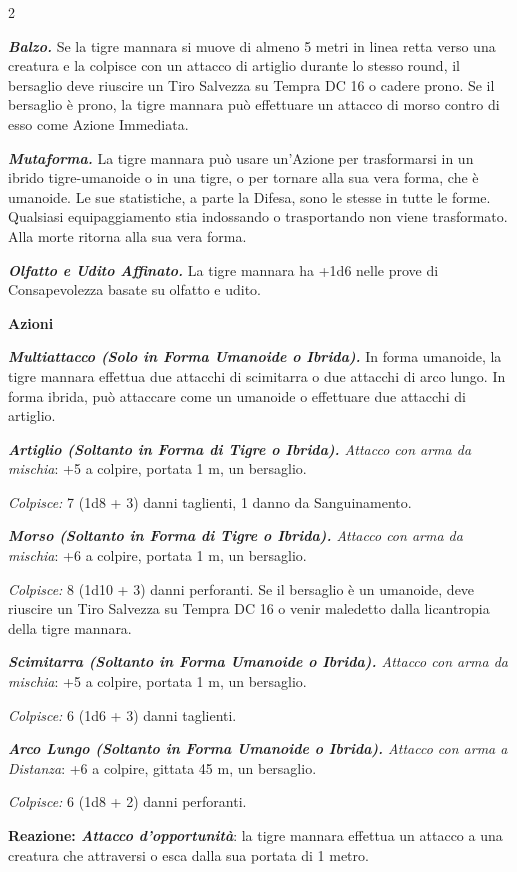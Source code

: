 \begin{multicols}{2}
{\emph{\textbf{Balzo.}} Se la tigre mannara si muove di almeno 5 metri in linea retta verso una creatura e la colpisce con un attacco di artiglio durante lo stesso round, il bersaglio deve riuscire un Tiro Salvezza su Tempra DC 16 o cadere prono. Se il bersaglio è prono, la tigre mannara può effettuare un attacco di morso contro di esso come Azione Immediata.

\emph{\textbf{Mutaforma.}} La tigre mannara può usare un'Azione per trasformarsi in un ibrido tigre-umanoide o in una tigre, o per tornare alla sua vera forma, che è umanoide. Le sue statistiche, a parte la Difesa, sono le stesse in tutte le forme. Qualsiasi equipaggiamento stia indossando o trasportando non viene trasformato. Alla morte ritorna alla sua vera forma.

\emph{\textbf{Olfatto e Udito Affinato.}} La tigre mannara ha +1d6 nelle prove di Consapevolezza basate su olfatto e udito.

\textbf{Azioni}

\emph{\textbf{Multiattacco (Solo in Forma Umanoide o Ibrida).}} In forma umanoide, la tigre mannara effettua due attacchi di scimitarra o due attacchi di arco lungo. In forma ibrida, può attaccare come un umanoide o effettuare due attacchi di artiglio.

\emph{\textbf{Artiglio (Soltanto in Forma di Tigre o Ibrida).} Attacco con arma da mischia}: +5 a colpire, portata 1 m, un bersaglio.

\emph{Colpisce:} 7 (1d8 + 3) danni taglienti, 1 danno da Sanguinamento.

\emph{\textbf{Morso (Soltanto in Forma di Tigre o Ibrida).} Attacco con arma da mischia}: +6 a colpire, portata 1 m, un bersaglio.

\emph{Colpisce:} 8 (1d10 + 3) danni perforanti. Se il bersaglio è un umanoide, deve riuscire un Tiro Salvezza su Tempra DC 16 o venir maledetto dalla licantropia della tigre mannara.

\emph{\textbf{Scimitarra (Soltanto in Forma Umanoide o Ibrida).} Attacco con arma da mischia}: +5 a colpire, portata 1 m, un bersaglio.

\emph{Colpisce:} 6 (1d6 + 3) danni taglienti.

\emph{\textbf{Arco Lungo (Soltanto in Forma Umanoide o Ibrida).} Attacco con arma a Distanza}: +6 a colpire, gittata 45 m, un bersaglio.

\emph{Colpisce:} 6 (1d8 + 2) danni perforanti.

\textbf{Reazione: \emph{Attacco d'opportunità}}: la tigre mannara effettua un attacco a una creatura che attraversi o esca dalla sua portata di 1 metro.

}
\end{multicols}
